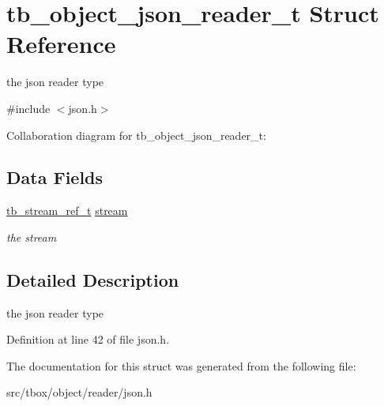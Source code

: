 \hypertarget{structtb__object__json__reader__t}{\section{tb\-\_\-object\-\_\-json\-\_\-reader\-\_\-t Struct Reference}
\label{structtb__object__json__reader__t}
}


the json reader type  




{\ttfamily \#include $<$json.\-h$>$}



Collaboration diagram for tb\-\_\-object\-\_\-json\-\_\-reader\-\_\-t\-:
\subsection*{Data Fields}
\begin{DoxyCompactItemize}
\item 
\hypertarget{structtb__object__json__reader__t_adb56cb0c716b38e909577cb451b95d62}{\hyperlink{structtb__stream__ref__t}{tb\-\_\-stream\-\_\-ref\-\_\-t} \hyperlink{structtb__object__json__reader__t_adb56cb0c716b38e909577cb451b95d62}{stream}}\label{structtb__object__json__reader__t_adb56cb0c716b38e909577cb451b95d62}

\begin{DoxyCompactList}\small\item\em the stream \end{DoxyCompactList}\end{DoxyCompactItemize}


\subsection{Detailed Description}
the json reader type 

Definition at line 42 of file json.\-h.



The documentation for this struct was generated from the following file\-:\begin{DoxyCompactItemize}
\item 
src/tbox/object/reader/json.\-h\end{DoxyCompactItemize}
